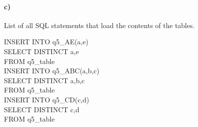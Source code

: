 \documentclass[a4paper,12pt]{article}
\begin{document}
\paragraph{c)} List of all SQL statements that load the contents of the tables.

\begin{tcolorbox}
INSERT INTO q5\_AE(a,e) \\
SELECT DISTINCT a,e\\
FROM q5\_table\\

INSERT INTO q5\_ABC(a,b,c) \\
SELECT DISTINCT a,b,c\\
FROM q5\_table\\

INSERT INTO q5\_CD(c,d)\\
SELECT DISTINCT c,d\\
FROM q5\_table
\end{tcolorbox}
\end{document}
